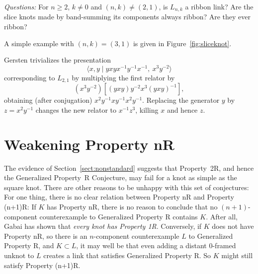 \documentclass{amsart}
\begin{document}
\bigskip

{\em Questions:}  For $n\ge 2$, $k\ne 0$ and $(n,k)\ne (2,1)$, is $L_{n,k}$ a ribbon link? Are the slice knots made by band-summing its components always ribbon? Are they ever ribbon?

\bigskip

A simple example with $(n,k)= (3,1)$ is given in Figure~\ref{fig:sliceknot}.

Gersten trivializes the presentation $$\langle x,y \; | \; yxyx^{-1}y^{-1}x^{-1},\  x^3y^{-2}\rangle$$ corresponding to
$L_{2,1}$ by multiplying the first relator by $$(x^3y^{-2})[(yxy)y^{-2}x^3(yxy)^{-1}],$$ obtaining (after conjugation) $x^2y^{-1}xy^{-1}x^2y^{-1}$. Replacing the generator $y$ by $z=x^2y^{-1}$ changes the new relator to $x^{-1}z^3$, killing $x$ and hence $z$.


\section{Weakening Property nR} \label{sect:weakening}

The evidence of Section~\ref{sect:nonstandard} suggests that Property~2R, and hence the Generalized Property~R Conjecture, may fail for a knot as simple as the square knot.  There are other reasons to be unhappy with this set of conjectures:   For one thing, there is no clear relation between Property nR and Property (n+1)R:  If $K$ has Property nR, there is no reason to conclude that no $(n+1)$-component counterexample to Generalized Property R contains $K$.  After all, Gabai has shown that {\em every knot has Property 1R}.  Conversely, if $K$ does not have Property nR, so there is an $n$-component counterexample $L$ to Generalized Property R, and $K \subset L$, it may well be that even adding a distant $0$-framed unknot to $L$ creates a link that satisfies Generalized Property R.  So $K$ might still satisfy Property (n+1)R.
\end{document}
